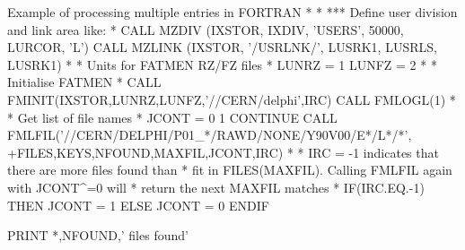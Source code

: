 \begin{XMPt}{Example of processing multiple entries in FORTRAN}
*                                                                       
* *** Define user division and link area like:                          
*                                                                       
      CALL MZDIV  (IXSTOR, IXDIV, 'USERS', 50000, LURCOR, 'L')          
      CALL MZLINK (IXSTOR, '/USRLNK/', LUSRK1, LUSRLS, LUSRK1)          
*                                                                       
*     Units for FATMEN RZ/FZ files                                      
*                                                                       
      LUNRZ = 1                                                         
      LUNFZ = 2                                                         
*                                                                       
*     Initialise FATMEN                                                 
*                                                                       
      CALL FMINIT(IXSTOR,LUNRZ,LUNFZ,'//CERN/delphi',IRC)               
      CALL FMLOGL(1)                                                    
*                                                                       
*     Get list of file names                                            
*                                                                       
      JCONT = 0                                                         
1     CONTINUE                                                          
      CALL FMLFIL('//CERN/DELPHI/P01_*/RAWD/NONE/Y90V00/E*/L*/*',       
     +FILES,KEYS,NFOUND,MAXFIL,JCONT,IRC)                               
*
*     IRC = -1 indicates that there are more files found than
*     fit in FILES(MAXFIL). Calling FMLFIL again with JCONT^=0 will
*     return the next MAXFIL matches
*
      IF(IRC.EQ.-1) THEN                                                
        JCONT = 1                                                       
      ELSE                                                              
        JCONT = 0                                                       
      ENDIF                                                             
                                                                        
      PRINT *,NFOUND,' files found'                                     
                                                                        

\end{XMPt}
